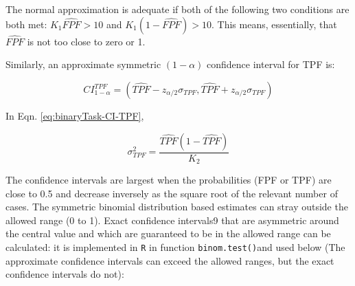 \documentclass[
]{book}
\begin{document}
The normal approximation is adequate if both of the following two conditions are both met: \(K_1\widehat{FPF} > 10\) and \(K_1(1-\widehat{FPF}) > 10\). This means, essentially, that \(\widehat{FPF}\) is not too close to zero or 1.

Similarly, an approximate symmetric \((1-\alpha)\) confidence interval for TPF is:

\begin{equation} 
CI_{1-\alpha}^{TPF}=\left ( \widehat{TPF} - z_{\alpha/2} \sigma_{TPF}, \widehat{TPF} + z_{\alpha/2} \sigma_{TPF} \right )
\label{eq:binaryTask-CI-TPF}
\end{equation}

In Eqn. \eqref{eq:binaryTask-CI-TPF},

\begin{equation} 
\sigma_{TPF}^2 = \frac{\widehat{TPF}\left ( 1 - \widehat{TPF} \right )}{K_2}
\label{eq:binaryTask-Var-TPF}
\end{equation}

The confidence intervals are largest when the probabilities (FPF or TPF) are close to 0.5 and decrease inversely as the square root of the relevant number of cases. The symmetric binomial distribution based estimates can stray outside the allowed range (0 to 1). Exact confidence intervals9 that are asymmetric around the central value and which are guaranteed to be in the allowed range can be calculated: it is implemented in \texttt{R} in function \texttt{binom.test()}and used below (The approximate confidence intervals can exceed the allowed ranges, but the exact confidence intervals do not):
\end{document}
